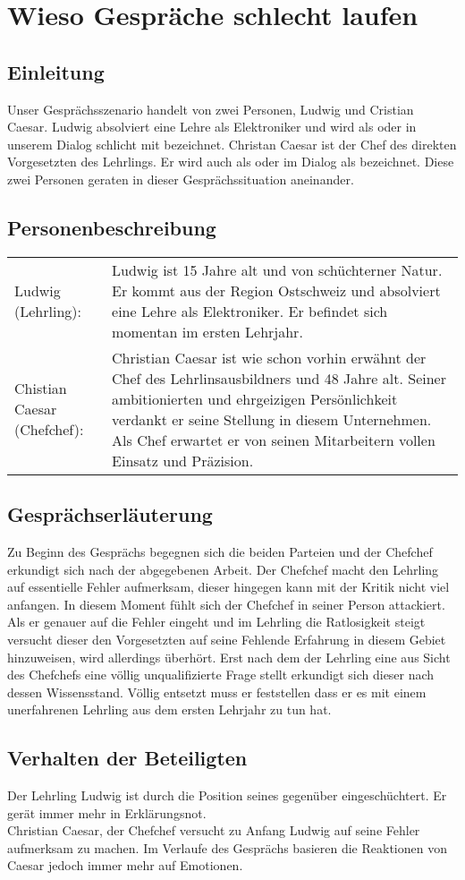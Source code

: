 \section*{Wieso Gespräche schlecht laufen}
\subsection*{Einleitung}
Unser Gesprächsszenario handelt von zwei Personen, Ludwig und Cristian Caesar. Ludwig absolviert eine Lehre als Elektroniker und wird als  oder in unserem Dialog schlicht mit bezeichnet. Christan Caesar ist der Chef des direkten Vorgesetzten des Lehrlings. Er wird auch als oder im Dialog als bezeichnet. Diese zwei Personen geraten in dieser Gesprächssituation aneinander.
\subsection*{Personenbeschreibung}
\begin{tabular}{p{150pt}p{280pt}}
Ludwig (Lehrling):	&
Ludwig ist 15 Jahre alt und von schüchterner Natur. Er kommt aus der Region Ostschweiz und absolviert eine Lehre als Elektroniker. Er befindet sich momentan im ersten Lehrjahr.\\ 
Chistian Caesar (Chefchef): & 
Christian Caesar ist wie schon vorhin erwähnt  der Chef des Lehrlinsausbildners und 48 Jahre alt. Seiner ambitionierten und ehrgeizigen Persönlichkeit verdankt er seine Stellung in diesem Unternehmen. Als Chef erwartet er von seinen 		Mitarbeitern vollen Einsatz und Präzision.
\end{tabular}
\subsection*{Gesprächserläuterung}
Zu Beginn des Gesprächs begegnen sich die beiden Parteien und der Chefchef erkundigt sich nach der abgegebenen Arbeit. Der Chefchef macht den Lehrling auf essentielle Fehler aufmerksam, dieser hingegen kann mit der Kritik nicht viel anfangen. In diesem Moment fühlt sich der Chefchef in seiner Person attackiert. Als er genauer auf die Fehler eingeht und im Lehrling die Ratlosigkeit steigt versucht dieser den Vorgesetzten auf seine Fehlende Erfahrung in diesem Gebiet hinzuweisen, wird allerdings überhört. Erst nach dem der Lehrling eine aus Sicht des Chefchefs eine völlig unqualifizierte Frage stellt erkundigt sich dieser nach dessen Wissensstand. Völlig entsetzt muss er feststellen dass er es mit einem unerfahrenen Lehrling aus dem ersten Lehrjahr zu tun hat. 
\subsection*{Verhalten der Beteiligten}
Der Lehrling Ludwig ist durch die Position seines gegenüber eingeschüchtert. Er gerät immer mehr in Erklärungsnot.\\
Christian Caesar, der Chefchef versucht zu Anfang Ludwig auf seine Fehler aufmerksam zu machen. Im Verlaufe des Gesprächs basieren die Reaktionen von Caesar jedoch immer mehr auf Emotionen.\\


